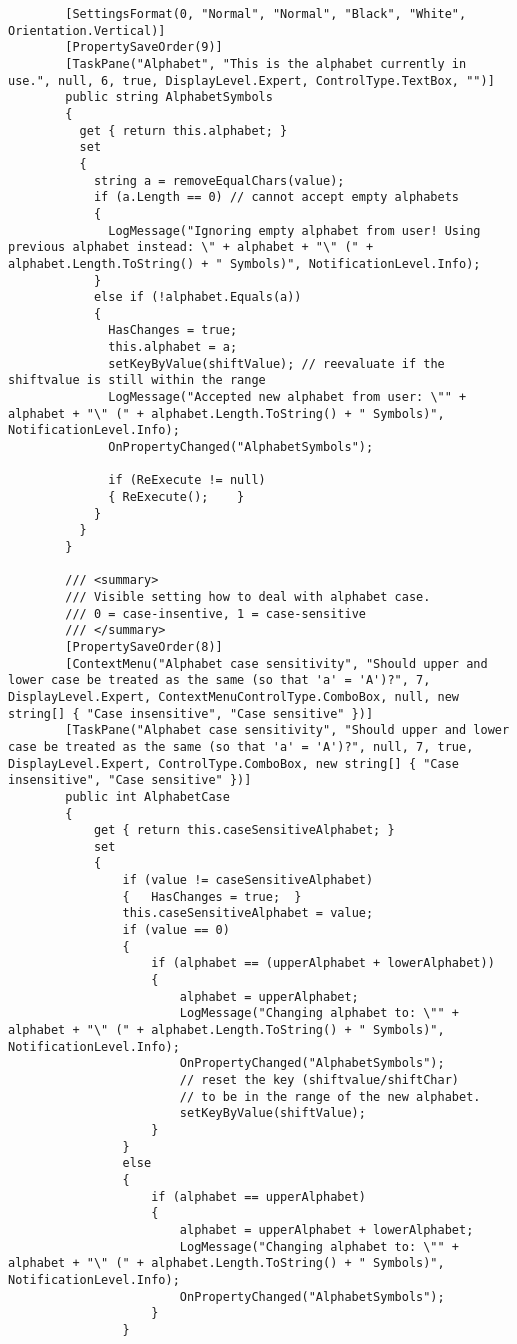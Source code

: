 \begin{lstlisting}
        [SettingsFormat(0, "Normal", "Normal", "Black", "White", Orientation.Vertical)]
        [PropertySaveOrder(9)]
        [TaskPane("Alphabet", "This is the alphabet currently in use.", null, 6, true, DisplayLevel.Expert, ControlType.TextBox, "")]
        public string AlphabetSymbols
        {
          get { return this.alphabet; }
          set
          {
            string a = removeEqualChars(value);
            if (a.Length == 0) // cannot accept empty alphabets
            {
              LogMessage("Ignoring empty alphabet from user! Using previous alphabet instead: \" + alphabet + "\" (" + alphabet.Length.ToString() + " Symbols)", NotificationLevel.Info);
            }
            else if (!alphabet.Equals(a))
            {
              HasChanges = true;
              this.alphabet = a;
              setKeyByValue(shiftValue); // reevaluate if the shiftvalue is still within the range
              LogMessage("Accepted new alphabet from user: \"" + alphabet + "\" (" + alphabet.Length.ToString() + " Symbols)", NotificationLevel.Info);
              OnPropertyChanged("AlphabetSymbols");

              if (ReExecute != null)
              {	ReExecute();	}
            }
          }
        }

        /// <summary>
        /// Visible setting how to deal with alphabet case.
        /// 0 = case-insentive, 1 = case-sensitive
        /// </summary>
        [PropertySaveOrder(8)]
        [ContextMenu("Alphabet case sensitivity", "Should upper and lower case be treated as the same (so that 'a' = 'A')?", 7, DisplayLevel.Expert, ContextMenuControlType.ComboBox, null, new string[] { "Case insensitive", "Case sensitive" })]
        [TaskPane("Alphabet case sensitivity", "Should upper and lower case be treated as the same (so that 'a' = 'A')?", null, 7, true, DisplayLevel.Expert, ControlType.ComboBox, new string[] { "Case insensitive", "Case sensitive" })]
        public int AlphabetCase
        {
            get { return this.caseSensitiveAlphabet; }
            set
            {
                if (value != caseSensitiveAlphabet)
                {	HasChanges = true;	}
                this.caseSensitiveAlphabet = value;
                if (value == 0)
                {
                    if (alphabet == (upperAlphabet + lowerAlphabet))
                    {
                        alphabet = upperAlphabet;
                        LogMessage("Changing alphabet to: \"" + alphabet + "\" (" + alphabet.Length.ToString() + " Symbols)", NotificationLevel.Info);
                        OnPropertyChanged("AlphabetSymbols");
                        // reset the key (shiftvalue/shiftChar)
                        // to be in the range of the new alphabet.
                        setKeyByValue(shiftValue);
                    }
                }
                else
                {
                    if (alphabet == upperAlphabet)
                    {
                        alphabet = upperAlphabet + lowerAlphabet;
                        LogMessage("Changing alphabet to: \"" + alphabet + "\" (" + alphabet.Length.ToString() + " Symbols)", NotificationLevel.Info);
                        OnPropertyChanged("AlphabetSymbols");
                    }
                }


\end{lstlisting}
